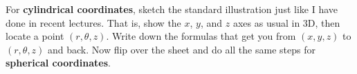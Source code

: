 For \textbf{cylindrical coordinates}, sketch the standard illustration just like I have done in recent lectures.  That is, show the $x$, $y$, and $z$ axes as usual in 3D, then locate a point $(r,\theta,z)$.  Write down the formulas that get you from $(x,y,z)$ to $(r,\theta,z)$ and back.  Now flip over the sheet and do all the same steps for \textbf{spherical coordinates}.
